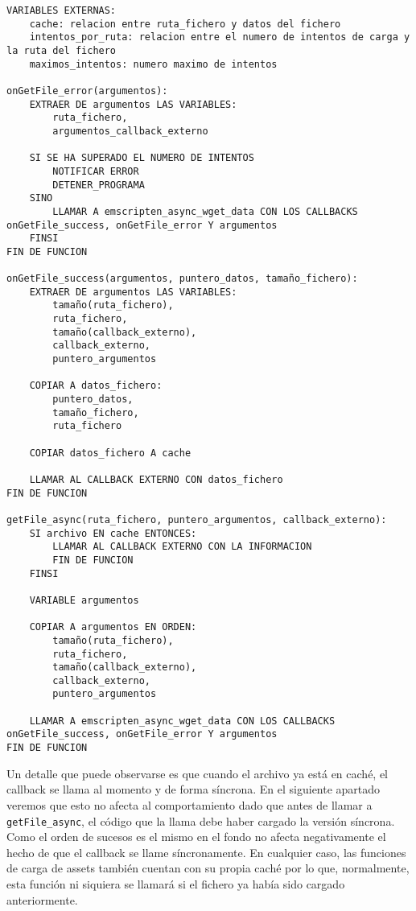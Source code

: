 \begin{lstlisting}
VARIABLES EXTERNAS:
    cache: relacion entre ruta_fichero y datos del fichero
    intentos_por_ruta: relacion entre el numero de intentos de carga y la ruta del fichero
    maximos_intentos: numero maximo de intentos

onGetFile_error(argumentos):
    EXTRAER DE argumentos LAS VARIABLES:
        ruta_fichero,
        argumentos_callback_externo
        
    SI SE HA SUPERADO EL NUMERO DE INTENTOS
        NOTIFICAR ERROR
        DETENER_PROGRAMA
    SINO
        LLAMAR A emscripten_async_wget_data CON LOS CALLBACKS onGetFile_success, onGetFile_error Y argumentos
    FINSI
FIN DE FUNCION

onGetFile_success(argumentos, puntero_datos, tamaño_fichero):
    EXTRAER DE argumentos LAS VARIABLES:
        tamaño(ruta_fichero),
        ruta_fichero,
        tamaño(callback_externo),
        callback_externo,
        puntero_argumentos
        
    COPIAR A datos_fichero:
        puntero_datos,
        tamaño_fichero,
        ruta_fichero
        
    COPIAR datos_fichero A cache
    
    LLAMAR AL CALLBACK EXTERNO CON datos_fichero
FIN DE FUNCION

getFile_async(ruta_fichero, puntero_argumentos, callback_externo):
    SI archivo EN cache ENTONCES:
        LLAMAR AL CALLBACK EXTERNO CON LA INFORMACION
        FIN DE FUNCION
    FINSI
    
    VARIABLE argumentos
    
    COPIAR A argumentos EN ORDEN: 
        tamaño(ruta_fichero), 
        ruta_fichero, 
        tamaño(callback_externo), 
        callback_externo,
        puntero_argumentos

	LLAMAR A emscripten_async_wget_data CON LOS CALLBACKS onGetFile_success, onGetFile_error Y argumentos
FIN DE FUNCION
\end{lstlisting}

Un detalle que puede observarse es que cuando el archivo ya está en caché, el callback se llama al momento y de forma síncrona. En el siguiente apartado veremos que esto no afecta al comportamiento dado que antes de llamar a \texttt{getFile\_async}, el código que la llama debe haber cargado la versión síncrona. Como el orden de sucesos es el mismo en el fondo no afecta negativamente el hecho de que el callback se llame síncronamente. En cualquier caso, las funciones de carga de assets también cuentan con su propia caché por lo que, normalmente, esta función ni siquiera se llamará si el fichero ya había sido cargado anteriormente.

